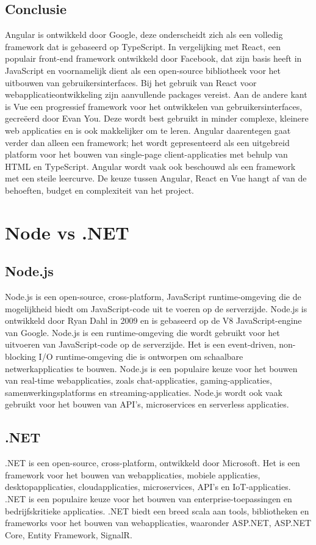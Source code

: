 \subsection*{Conclusie}
Angular is ontwikkeld door Google, deze onderscheidt zich als een volledig
framework dat is gebaseerd op TypeScript. In vergelijking met React, een
populair front-end framework ontwikkeld door Facebook, dat zijn basis heeft in
JavaScript en voornamelijk dient als een open-source bibliotheek voor het
uitbouwen van gebruikersinterfaces. Bij het gebruik van React voor
webapplicatieontwikkeling zijn aanvullende packages vereist. Aan de andere kant
is Vue een progressief framework voor het ontwikkelen van gebruikersinterfaces,
gecreëerd door Evan You.\cite{EvanYou2024} Deze wordt best gebruikt in
minder complexe, kleinere web applicaties en is ook makkelijker om te leren.
Angular daarentegen gaat verder dan alleen een framework; het wordt
gepresenteerd als een uitgebreid platform voor het bouwen van single-page
client-applicaties met behulp van HTML en TypeScript. Angular wordt vaak ook
beschouwd als een framework met een steile leercurve. De keuze tussen Angular,
React en Vue hangt af van de behoeften, budget en complexiteit van het
project.\autocite{Joshi2023}

\section*{Node vs .NET}%
\subsection*{Node.js}%
Node.js is een open-source, cross-platform, JavaScript runtime-omgeving die de
mogelijkheid biedt om JavaScript-code uit te voeren op de serverzijde. Node.js
is ontwikkeld door Ryan Dahl in 2009 en is gebaseerd op de V8 JavaScript-engine
van Google. Node.js is een runtime-omgeving die wordt gebruikt voor het
uitvoeren van JavaScript-code op de serverzijde. Het is een event-driven,
non-blocking I/O runtime-omgeving die is ontworpen om schaalbare
netwerkapplicaties te bouwen. Node.js is een populaire keuze voor het bouwen
van real-time webapplicaties, zoals chat-applicaties, gaming-applicaties,
samenwerkingsplatforms en streaming-applicaties. Node.js wordt ook vaak
gebruikt voor het bouwen van API's, microservices en serverless applicaties.
\autocite{Nodejs2023}

\subsection*{.NET}%
.NET is een open-source, cross-platform, ontwikkeld door Microsoft. Het is een framework voor het bouwen van webapplicaties, mobiele applicaties, desktopapplicaties, cloudapplicaties, microservices, API's en IoT-applicaties. .NET is een populaire keuze voor het bouwen van enterprise-toepassingen en bedrijfskritieke applicaties. .NET biedt een breed scala aan tools, bibliotheken en frameworks voor het bouwen van webapplicaties, waaronder ASP.NET, ASP.NET Core,  Entity Framework, SignalR.\autocite{Microsoft2024}

